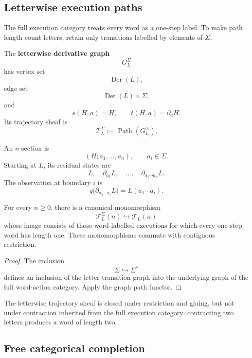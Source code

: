 \subsection{Letterwise execution paths}
\label{subsec:letterwise-execution-paths}

The full execution category treats every word as a one-step label. To make
path length count letters, retain only transitions labelled by elements of
\(\Sigma\).

\begin{definition}
\label{def:letterwise-derivative-graph}
The \textbf{letterwise derivative graph}
\[
    G_L^\Sigma
\]
has vertex set
\[
    \operatorname{Der}(L),
\]
edge set
\[
    \operatorname{Der}(L)\times\Sigma,
\]
and
\[
    s(H,a)=H,
    \qquad
    t(H,a)=\partial_aH.
\]
Its trajectory sheaf is
\[
    \mathscr T_L^\Sigma
    :=
    \operatorname{Path}(G_L^\Sigma).
\]
\end{definition}

An \(n\)-section is
\[
    (H;a_1,\ldots,a_n),
    \qquad
    a_i\in\Sigma.
\]
Starting at \(L\), its residual states are
\[
    L,
    \quad
    \partial_{a_1}L,
    \quad
    \ldots,
    \quad
    \partial_{a_1\cdots a_n}L.
\]
The observation at boundary \(i\) is
\[
    q\bigl(\partial_{a_1\cdots a_i}L\bigr)
    =
    L(a_1\cdots a_i).
\]

\begin{proposition}
\label{prop:letterwise-restriction}
For every \(n\geq0\), there is a canonical monomorphism
\[
    \mathscr T_L^\Sigma(n)
    \hookrightarrow
    \mathscr T_L(n)
\]
whose image consists of those word-labelled executions for which every
one-step word has length one. These monomorphisms commute with contiguous
restriction.
\end{proposition}

\begin{proof}
The inclusion
\[
    \Sigma\hookrightarrow\Sigma^\ast
\]
defines an inclusion of the letter-transition graph into the underlying
graph of the full word-action category. Apply the graph path functor.
\end{proof}

The letterwise trajectory sheaf is closed under restriction and gluing, but
not under contraction inherited from the full execution category:
contracting two letters produces a word of length two.

\subsection{Free categorical completion}
\label{subsec:free-categorical-completion}

